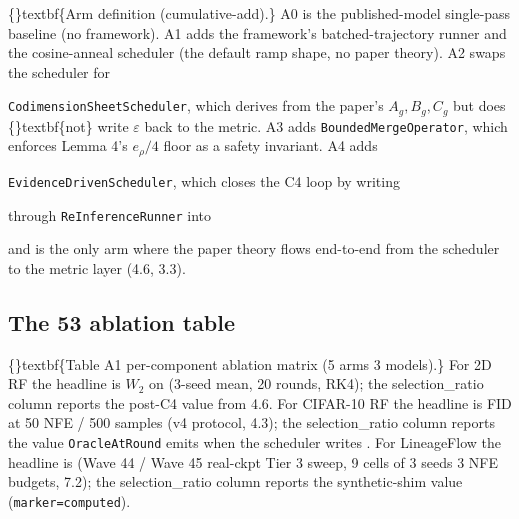 \documentclass{article}
\begin{document}
\{\}textbf\{Arm definition (cumulative-add).\} A0 is the published-model single-pass baseline (no framework). A1 adds the framework's batched-trajectory runner and the cosine-anneal scheduler (the default ramp shape, no paper theory). A2 swaps the scheduler for

\texttt{CodimensionSheetScheduler}, which derives  from the paper's $A_g, B_g, C_g$ but does \{\}textbf\{not\} write $\varepsilon$ back to the metric. A3 adds \texttt{BoundedMergeOperator}, which enforces Lemma 4's $e_\rho/4$ floor as a safety invariant. A4 adds

\texttt{EvidenceDrivenScheduler}, which closes the C4 loop by writing

 through \texttt{ReInferenceRunner} into

 and is the only arm where the paper theory flows end-to-end from the scheduler to the metric layer (4.6, 3.3).

\subsection{The 53 ablation table}
\{\}textbf\{Table A1  per-component ablation matrix (5 arms  3 models).\} For 2D RF the headline is $W_2$ on  (3-seed mean, 20 rounds, RK4); the selection\_ratio column reports the post-C4 value from 4.6. For CIFAR-10 RF the headline is FID at 50 NFE / 500 samples (v4 protocol, 4.3); the selection\_ratio column reports the value \texttt{OracleAtRound} emits when the scheduler writes . For LineageFlow the headline is  (Wave 44 / Wave 45 real-ckpt Tier 3 sweep, 9 cells of 3 seeds  3 NFE budgets, 7.2); the selection\_ratio column reports the synthetic-shim value (\texttt{marker=computed}).
\end{document}
